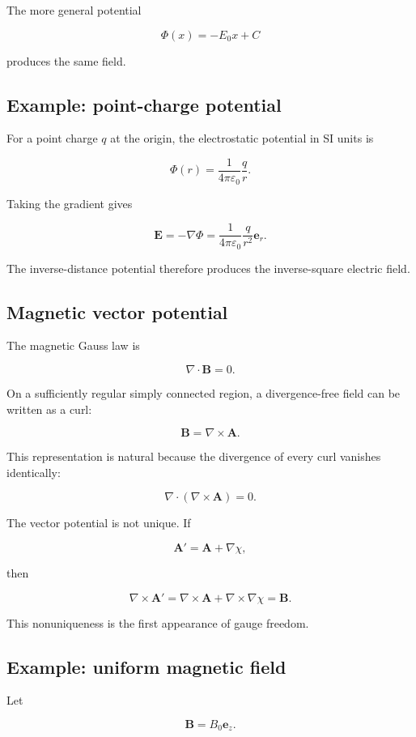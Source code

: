 The more general potential

\[
\Phi(x)
=
-E_0x+C
\]

produces the same field.

\subsection{Example: point-charge potential}

For a point charge \(q\) at the origin, the electrostatic potential in SI units is

\[
\boxed{
\Phi(r)
=
\frac{1}{4\pi\varepsilon_0}
\frac{q}{r}
}.
\]

Taking the gradient gives

\[
\mathbf{E}
=
-\nabla\Phi
=
\frac{1}{4\pi\varepsilon_0}
\frac{q}{r^2}
\mathbf{e}_r.
\]

The inverse-distance potential therefore produces the inverse-square electric field.

\subsection{Magnetic vector potential}

The magnetic Gauss law is

\[
\nabla\cdot\mathbf{B}=0.
\]

On a sufficiently regular simply connected region, a divergence-free field can be written as a curl:

\[
\boxed{
\mathbf{B}
=
\nabla\times\mathbf{A}
}.
\]

This representation is natural because the divergence of every curl vanishes identically:

\[
\nabla\cdot
\left(
\nabla\times\mathbf{A}
\right)
=0.
\]

The vector potential is not unique. If

\[
\mathbf{A}'
=
\mathbf{A}
+
\nabla\chi,
\]

then

\[
\nabla\times\mathbf{A}'
=
\nabla\times\mathbf{A}
+
\nabla\times\nabla\chi
=
\mathbf{B}.
\]

This nonuniqueness is the first appearance of gauge freedom.

\subsection{Example: uniform magnetic field}

Let

\[
\mathbf{B}
=
B_0\mathbf{e}_z.
\]


